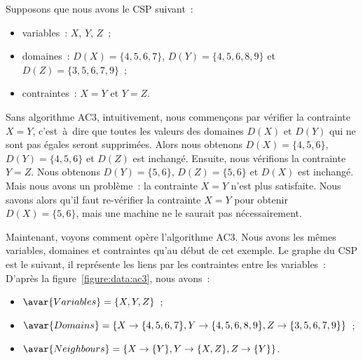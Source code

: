 \begin{example}
\label{example:data:ac3}

Supposons que nous avons le CSP suivant~:
%
\begin{itemize}

\item variables~: $X$, $Y$, $Z$~;

\item domaines~: $D(X) = \{4, 5, 6, 7\}$, $D(Y) = \{4, 5, 6, 8, 9\}$ et $D(Z) =
\{3, 5, 6, 7, 9\}$~;

\item contraintes~: $X = Y$ et $Y = Z$.

\end{itemize}

Sans algorithme AC3, intuitivement, nous commençons par vérifier la contrainte
$X = Y$, c'est~à~dire que toutes les valeurs des domaines $D(X)$ et $D(Y)$ qui
ne sont pas égales seront supprimées. Alors nous obtenons $D(X) = \{4, 5, 6\}$,
$D(Y) = \{4, 5, 6\}$ et $D(Z)$ est inchangé. Ensuite, nous vérifions la
contrainte $Y = Z$. Nous obtenons $D(Y) = \{5, 6\}$, $D(Z) = \{5, 6\}$ et $D(X)$
est inchangé.  Mais nous avons un problème~: la contrainte $X = Y$ n'est plus
satisfaite. Nous savons alors qu'il faut re-vérifier la contrainte $X = Y$ pour
obtenir $D(X) = \{5, 6\}$, mais une machine ne le saurait pas nécessairement.

Maintenant, voyons comment opère l'algorithme AC3. Nous avons les mêmes
variables, domaines et contraintes qu'au début de cet exemple. Le graphe du CSP
est le suivant, il représente les liens par les contraintes entre les
variables~:
%
%
D'après la figure~\ref{figure:data:ac3}, nous avons~:
%
\begin{itemize}

\item $\avar{Variables} = \{X, Y, Z\}$~;

\item $\avar{Domains} = \{X \rightarrow \{4, 5, 6, 7\}, Y \rightarrow \{4, 5, 6,
8, 9\}, Z \rightarrow \{3, 5, 6, 7, 9\}\}$~;

\item $\avar{Neighbours} = \{X \rightarrow \{Y\}, Y \rightarrow \{X, Z\}, Z \rightarrow \{Y\}\}$.


\end{itemize}
\end{example}
